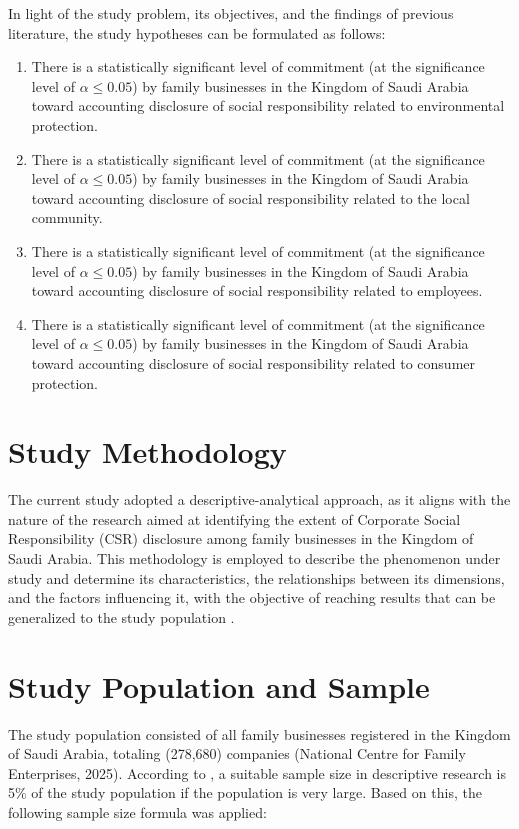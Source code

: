 \documentclass[10pt]{NSP1}
\begin{document}
	In light of the study problem, its objectives, and the findings of previous literature, the study hypotheses can be formulated as follows:
	\begin{enumerate}
		\item There is a statistically significant level of commitment (at the significance level of \(\alpha \leq 0.05\)) by family businesses in the Kingdom of Saudi Arabia toward accounting disclosure of social responsibility related to environmental protection.
		\item There is a statistically significant level of commitment (at the significance level of \(\alpha \leq 0.05\)) by family businesses in the Kingdom of Saudi Arabia toward accounting disclosure of social responsibility related to the local community.
		\item There is a statistically significant level of commitment (at the significance level of \(\alpha \leq 0.05\)) by family businesses in the Kingdom of Saudi Arabia toward accounting disclosure of social responsibility related to employees.
		\item There is a statistically significant level of commitment (at the significance level of \(\alpha \leq 0.05\)) by family businesses in the Kingdom of Saudi Arabia toward accounting disclosure of social responsibility related to consumer protection.
	\end{enumerate}
	
	\section{Study Methodology}
	
	The current study adopted a descriptive-analytical approach, as it aligns with the nature of the research aimed at identifying the extent of Corporate Social Responsibility (CSR) disclosure among family businesses in the Kingdom of Saudi Arabia. This methodology is employed to describe the phenomenon under study and determine its characteristics, the relationships between its dimensions, and the factors influencing it, with the objective of reaching results that can be generalized to the study population \cite{AlQahtani2013}.
	
	\section{Study Population and Sample}
	
	The study population consisted of all family businesses registered in the Kingdom of Saudi Arabia, totaling (278,680) companies (National Centre for Family Enterprises, 2025). According to \cite{Mustafa2003}, a suitable sample size in descriptive research is 5\% of the study population if the population is very large. Based on this, the following sample size formula was applied:
	
\end{document}
